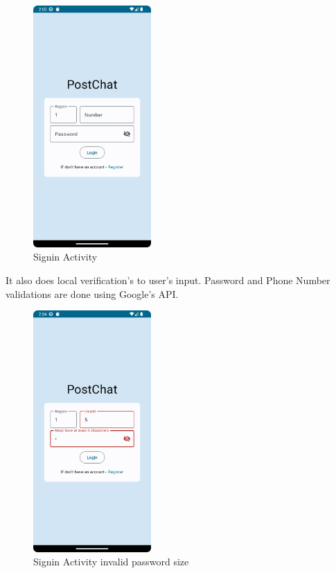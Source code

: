 \begin{figure}[!ht]
	\centering
	\includegraphics[trim={0cm -3cm 0 -3cm}, width=0.4\textwidth]{./Chapter6/Figures/SignInActivityLogin}
	\caption{Signin Activity}
	\label{fig:SA1}
\end{figure}


It also does local verification's to user's input. Password and Phone Number validations are done using Google's API.

\begin{figure}[!ht]
	\centering
	\includegraphics[trim={0cm -3cm 0 -3cm}, width=0.4\textwidth]{./Chapter6/Figures/SignInActivityErrors}
	\caption{Signin Activity invalid password size}
	\label{fig:SA2}
\end{figure}


